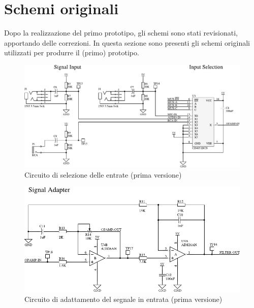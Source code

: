 
\section{Schemi originali}
Dopo la realizzazione del primo prototipo, gli schemi sono stati revisionati,
apportando delle correzioni. In questa sezione sono presenti gli schemi
originali utilizzati per produrre il (primo) prototipo.
\begin{figure}[H] \centering
    \includegraphics[width=.9\linewidth]{figures/circuits/input-selection-v1.pdf}
    \caption{
        Circuito di selezione delle entrate (prima versione)
        \label{fig:input-selection-v1}
    }
\end{figure}
\begin{figure}[H] \centering
    \includegraphics[width=.9\linewidth]{figures/circuits/filter-ampl-v1.pdf}
    \caption[Circuito di adattamento del segnale]{
        Circuito di adattamento del segnale in entrata (prima versione)
        \label{fig:filter-ampl-v1}
    }
\end{figure}
